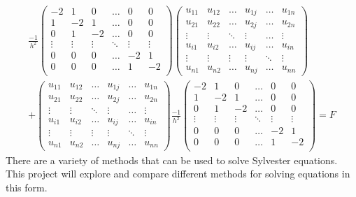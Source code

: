 \documentclass{article}
\numberwithin{equation}{section}
\begin{document}
\begin{eqnarray}
\frac{-1}{h^2} 
\begin{pmatrix}
-2 & 1 & 0 & \dots & 0 & 0 \\
1 & -2 & 1 & \dots & 0 & 0 \\
0 & 1 & -2 & \dots & 0 & 0 \\
\vdots & \vdots & \vdots & \ddots & \vdots & \vdots \\
0 & 0 & 0 & \dots & -2 & 1 \\
0 & 0 & 0 & \dots & 1 & -2 \\
\end{pmatrix}
\begin{pmatrix}
u_{11} & u_{12} & \dots & u_{1j} & \dots & u_{1n} \\
u_{21} & u_{22} & \dots & u_{2j} & \dots & u_{2n} \\
\vdots & \vdots & \ddots & \vdots & \dots & \vdots \\
u_{i1} & u_{i2} & \dots & u_{ij} & \dots & u_{in} \\
\vdots & \vdots & \vdots & \vdots & \ddots & \vdots \\
u_{n1} & u_{n2} & \dots & u_{nj} & \dots & u_{nn}
\end{pmatrix} \nonumber \\ \nonumber
+
\begin{pmatrix}
u_{11} & u_{12} & \dots & u_{1j} & \dots & u_{1n} \\
u_{21} & u_{22} & \dots & u_{2j} & \dots & u_{2n} \\
\vdots & \vdots & \ddots & \vdots & \dots & \vdots \\
u_{i1} & u_{i2} & \dots & u_{ij} & \dots & u_{in} \\
\vdots & \vdots & \vdots & \vdots & \ddots & \vdots \\
u_{n1} & u_{n2} & \dots & u_{nj} & \dots & u_{nn}
\end{pmatrix}
\frac{-1}{h^2} 
\begin{pmatrix}
-2 & 1 & 0 & \dots & 0 & 0 \\
1 & -2 & 1 & \dots & 0 & 0 \\
0 & 1 & -2 & \dots & 0 & 0 \\
\vdots & \vdots & \vdots & \ddots & \vdots & \vdots \\
0 & 0 & 0 & \dots & -2 & 1 \\
0 & 0 & 0 & \dots & 1 & -2 \\
\end{pmatrix}
= F
\end{eqnarray}
There are a variety of methods that can be used to solve Sylvester equations. This project will explore and compare different methods for solving equations in this form. 
\end{document}
